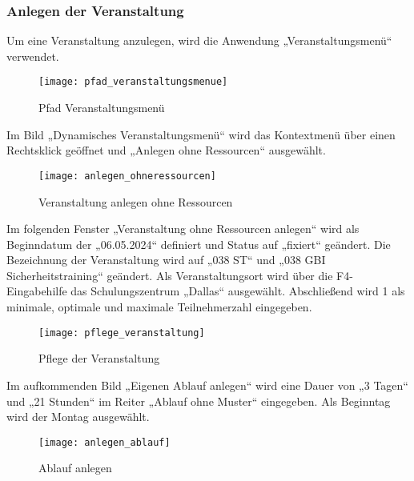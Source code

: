 \subsubsection{Anlegen der Veranstaltung}
Um eine Veranstaltung anzulegen, wird die Anwendung „Veranstaltungsmenü“ verwendet.
\begin{figure}[H]
	\centering
	\texttt{[image: pfad\_veranstaltungsmenue]}
	\caption{Pfad Veranstaltungsmenü}
	\label{fig:pfad_veranstaltungsmenue}
\end{figure}
Im Bild „Dynamisches Veranstaltungsmenü“ wird das Kontextmenü über einen Rechtsklick geöffnet und „Anlegen ohne Ressourcen“ ausgewählt.
\begin{figure}[H]
	\centering
	\texttt{[image: anlegen\_ohneressourcen]}
	\caption{Veranstaltung anlegen ohne Ressourcen}
	\label{fig:anlegen_ohneressourcen}
\end{figure}
Im folgenden Fenster „Veranstaltung ohne Ressourcen anlegen“ wird als Beginndatum der „06.05.2024“ definiert und Status auf „fixiert“ geändert. Die Bezeichnung der Veranstaltung wird auf „038 ST“ und „038 GBI Sicherheitstraining“ geändert. Als Veranstaltungsort wird über die F4-Eingabehilfe das Schulungszentrum „Dallas“ ausgewählt. Abschließend wird 1 als minimale, optimale und maximale Teilnehmerzahl eingegeben.
\begin{figure}[H]
	\centering
	\texttt{[image: pflege\_veranstaltung]}
	\caption{Pflege der Veranstaltung}
	\label{fig:pflege_veranstaltung}
\end{figure}
Im aufkommenden Bild „Eigenen Ablauf anlegen“ wird eine Dauer von „3 Tagen“ und „21 Stunden“ im Reiter „Ablauf ohne Muster“ eingegeben. Als Beginntag wird der Montag ausgewählt.
\begin{figure}[H]
	\centering
	\texttt{[image: anlegen\_ablauf]}
	\caption{Ablauf anlegen}
	\label{fig:anlegen_ablauf}
\end{figure}

